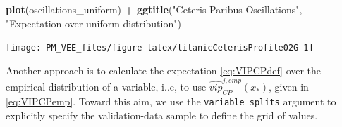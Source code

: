 \documentclass[12pt,]{krantz}
\newenvironment{Shaded}{\begin{snugshade}}{\end{snugshade}}
\newcommand{\DataTypeTok}[1]{\textcolor[rgb]{0.13,0.29,0.53}{#1}}
\newcommand{\KeywordTok}[1]{\textcolor[rgb]{0.13,0.29,0.53}{\textbf{#1}}}
\newcommand{\NormalTok}[1]{#1}
\newcommand{\OperatorTok}[1]{\textcolor[rgb]{0.81,0.36,0.00}{\textbf{#1}}}
\newcommand{\StringTok}[1]{\textcolor[rgb]{0.31,0.60,0.02}{#1}}
\theoremstyle{definition}
\theoremstyle{definition}
\theoremstyle{definition}
\theoremstyle{remark}
\begin{document}
\begin{Shaded}
\begin{Highlighting}[]
\KeywordTok{plot}\NormalTok{(oscillations_uniform) }\OperatorTok{+}\StringTok{ }\KeywordTok{ggtitle}\NormalTok{(}\StringTok{"Ceteris Paribus Oscillations"}\NormalTok{, }\StringTok{"Expectation over uniform distribution"}\NormalTok{)}
\end{Highlighting}
\end{Shaded}

\begin{center}\texttt{[image: PM\_VEE\_files/figure-latex/titanicCeterisProfile02G-1]} \end{center}

Another approach is to calculate the expectation \eqref{eq:VIPCPdef} over
the empirical distribution of a variable, i..e, to use
\(\widehat{vip}_{CP}^{j,emp}(x_*)\), given in \eqref{eq:VIPCPemp}. Toward
this aim, we use the \texttt{variable\_splits} argument to explicitly
specify the validation-data sample to define the grid of values.

\begin{Shaded}
\end{Shaded}

\begin{Shaded}
\end{Shaded}
\end{document}
